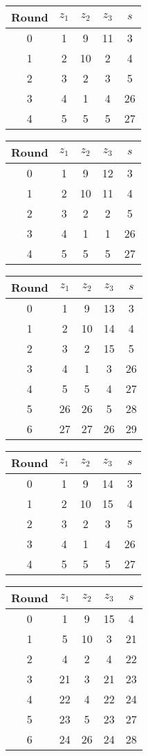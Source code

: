\begin{multicols}{2}
\begin{tabular}{c | c | c | c | c }
Round & $z_1$ & $z_2$ & $z_3$ & $s$ \\
\hline
0 & 1 & 9 & 11 & 3 \\
1 & 2 & 10 & 2 & 4 \\
2 & 3 & 2 & 3 & 5 \\
3 & 4 & 1 & 4 & 26 \\
4 & 5 & 5 & 5 & 27
\end{tabular}


\begin{tabular}{c | c | c | c | c }
Round & $z_1$ & $z_2$ & $z_3$ & $s$ \\
\hline
0 & 1 & 9 & 12 & 3 \\
1 & 2 & 10 & 11 & 4 \\
2 & 3 & 2 & 2 & 5 \\
3 & 4 & 1 & 1 & 26 \\
4 & 5 & 5 & 5 & 27
\end{tabular}


\begin{tabular}{c | c | c | c | c }
Round & $z_1$ & $z_2$ & $z_3$ & $s$ \\
\hline
0 & 1 & 9 & 13 & 3 \\
1 & 2 & 10 & 14 & 4 \\
2 & 3 & 2 & 15 & 5 \\
3 & 4 & 1 & 3 & 26 \\
4 & 5 & 5 & 4 & 27 \\
5 & 26 & 26 & 5 & 28 \\
6 & 27 & 27 & 26 & 29
\end{tabular}


\begin{tabular}{c | c | c | c | c }
Round & $z_1$ & $z_2$ & $z_3$ & $s$ \\
\hline
0 & 1 & 9 & 14 & 3 \\
1 & 2 & 10 & 15 & 4 \\
2 & 3 & 2 & 3 & 5 \\
3 & 4 & 1 & 4 & 26 \\
4 & 5 & 5 & 5 & 27
\end{tabular}


\begin{tabular}{c | c | c | c | c }
Round & $z_1$ & $z_2$ & $z_3$ & $s$ \\
\hline
0 & 1 & 9 & 15 & 4 \\
1 & 5 & 10 & 3 & 21 \\
2 & 4 & 2 & 4 & 22 \\
3 & 21 & 3 & 21 & 23 \\
4 & 22 & 4 & 22 & 24 \\
5 & 23 & 5 & 23 & 27 \\
6 & 24 & 26 & 24 & 28
\end{tabular}



\end{multicols}
